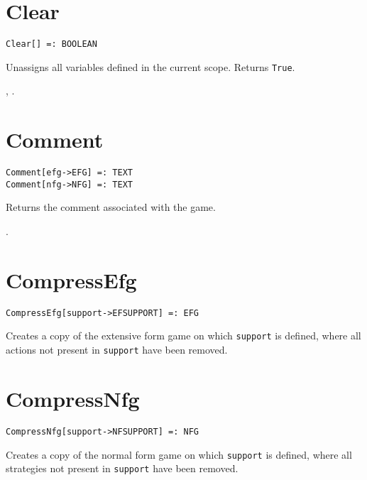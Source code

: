 \section*{Clear}\label{PrimClear}
\begin{verbatim}
Clear[] =: BOOLEAN 
\end{verbatim}

\noindent
Unassigns all variables defined in the current scope.  Returns \verb+True+.

\seealso {}, .


\section*{Comment}\label{PrimComment}
\begin{verbatim}
Comment[efg->EFG] =: TEXT
Comment[nfg->NFG] =: TEXT
\end{verbatim}

\noindent
Returns the comment associated with the game.

\seealso {}.


\section*{CompressEfg}\label{PrimCompressEfg}
\begin{verbatim}
CompressEfg[support->EFSUPPORT] =: EFG 
\end{verbatim}

\noindent
Creates a copy of the extensive form game on which \verb+support+ is
defined, where all actions not present in \verb+support+ have been
removed.


\section*{CompressNfg}\label{PrimCompressNfg}
\begin{verbatim}
CompressNfg[support->NFSUPPORT] =: NFG 
\end{verbatim}

\noindent
Creates a copy of the normal form game on which \verb+support+ is
defined, where all strategies not present in \verb+support+ have been
removed.

